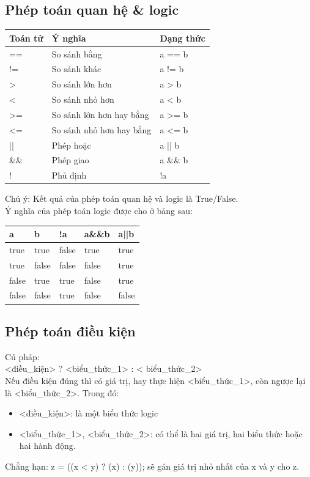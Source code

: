 \subsection{Phép toán quan hệ \& logic}
\begin{center}
\begin{tabular}{ lll}
\hline
Toán tử&Ý nghĩa&Dạng thức\\
\hline
== &So sánh bằng&a == b\\
\hline
!= &So sánh khác&a != b\\
\hline
> &So sánh lớn hơn&a > b\\
\hline
< &So sánh nhỏ hơn&a < b\\
\hline
>= &So sánh lớn hơn hay bằng&a >= b\\
\hline
<= &So sánh nhỏ hơn hay bằng&a <= b\\
\hline
||&Phép hoặc&a || b\\
\hline
\&\&&Phép giao&a \&\& b\\
\hline
!&Phủ định&!a\\
\hline

\end{tabular}
\end{center}
\indent Chú ý: Kết quả của phép toán quan hệ và logic là True/False. \\
\indent Ý nghĩa của phép toán logic được cho ở bảng sau:\\
\begin{center}
\begin{tabular}{ lllll}
\hline
a&b&!a&a\&\&b&a||b\\
\hline
true&true&false&true&true\\
\hline
true&false&false&false&true\\
\hline
false&true&true&false&true\\
\hline
false&false&true&false&false\\
\hline
\end{tabular}
\end{center}
\subsection{Phép toán điều kiện}
\indent Cú pháp: \\
{\ttfamily
<điều\_kiện> ? <biểu\_thức\_1> : < biểu\_thức\_2>}\\
\indent Nếu điều kiện đúng thì có giá trị, hay thực hiện {\ttfamily<biểu\_thức\_1>}, còn ngược lại là {\ttfamily<biểu\_thức\_2>}. Trong đó:
\begin{itemize}
\item {\ttfamily <điều\_kiện>}: là một biểu thức logic
\item {\ttfamily <biểu\_thức\_1>, <biểu\_thức\_2>}: có thể là hai giá trị, hai biểu thức hoặc hai hành động.
\end{itemize}
\indent Chẳng hạn: {\ttfamily z = ((x < y) ? (x) : (y));} sẽ gán giá trị nhỏ nhất của {\ttfamily x và y cho z}.

